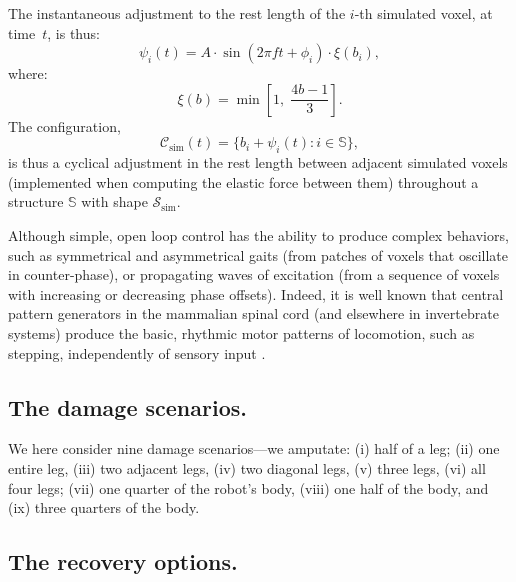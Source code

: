The instantaneous adjustment to the rest length of the $i$-th simulated voxel, at time~$t$, is thus:
\begin{equation}
\label{eq5:beam_actuation}
\psi_i(t) = A \cdot \sin(2\pi f t + \phi_i) \cdot \xi(b_i) ,
\end{equation}
where:
\begin{equation}
\label{eq5:beam_damp}
\xi(b) = \min\left[ 1,\; \frac{4b - 1}{3} \right] .
\end{equation}
The configuration,
\begin{equation}
\label{eq5:beam_configuration}
\mathcal{C}_{\text{sim}}(t) = \{b_i + \psi_i(t) : i \in \mathbb{S} \} ,
\end{equation}
is thus a cyclical adjustment in the rest length between adjacent simulated voxels (implemented when computing the elastic force between them) throughout a structure $\mathbb{S}$ with shape $\mathcal{S}_{\text{sim}}$.


Although simple, open loop control has the ability to produce complex behaviors,
such as symmetrical and asymmetrical gaits (from patches of voxels that oscillate in counter-phase), or propagating waves of excitation (from a sequence of voxels with increasing or decreasing phase offsets).
Indeed, it is well known that central pattern generators in the mammalian spinal cord (and elsewhere in invertebrate systems) produce the basic, rhythmic motor patterns of locomotion, such as stepping, independently of sensory input \cite{goulding2009circuits}.


\subsection*{The damage scenarios.}


We here consider nine damage scenarios---we amputate: (i) half of a leg; (ii) one entire leg, (iii) two adjacent legs, (iv) two diagonal legs, (v) three legs, (vi) all four legs; (vii) one quarter of the robot's body, (viii) one half of the body, and (ix) three quarters of the body.




\subsection*{The recovery options.}


